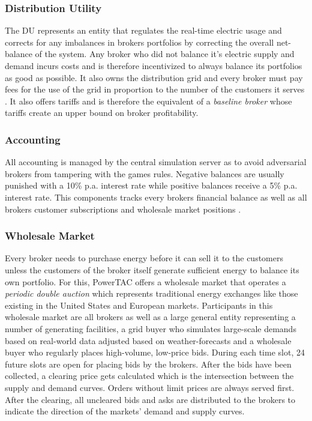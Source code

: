 \subsubsection{Distribution Utility}
The \ac{DU} represents an entity that regulates the real-time electric usage and corrects for any imbalances in brokers portfolios by correcting the overall net-balance of the system. Any broker who did not balance it's electric supply and demand incurs costs and is therefore incentivized to always balance its portfolios as good as possible. It also owns the distribution grid and every broker must pay fees for the use of the grid in proportion to the number of the customers it serves \citep[p.10]{ketter2018powertac}. It also offers tariffs and is therefore the equivalent of a \emph{baseline broker} whose tariffs create an upper bound on broker profitability. 

\subsubsection{Accounting}
All accounting is managed by the central simulation server as to avoid adversarial brokers from tampering with the games rules. Negative balances are usually punished with a 10\% p.a. interest rate while positive balances receive a 5\% p.a. interest rate. This components tracks every brokers financial balance as well as all brokers customer subscriptions and wholesale market positions \citep[p.11]{ketter2018powertac}.

\subsubsection{Wholesale Market}
Every broker needs to purchase energy before it can sell it to the customers unless the customers of the broker itself generate sufficient energy to balance its own portfolio. For this, \ac{PowerTAC} offers a wholesale market that operates a \emph{periodic double auction} which represents traditional energy exchanges like those existing in the United States and European markets. Participants in this wholesale market are all brokers as well as a large general entity representing a number of generating facilities, a grid buyer who simulates large-scale demands based on real-world data adjusted based on weather-forecasts and a wholesale buyer who regularly places high-volume, low-price bids. During each time slot, 24 future slots are open for placing bids by the brokers. After the bids have been collected, a clearing price gets calculated which is the intersection between the supply and demand curves. Orders without limit prices are always served first. After the clearing, all uncleared bids and asks are distributed to the brokers to indicate the direction of the markets' demand and supply curves. 

